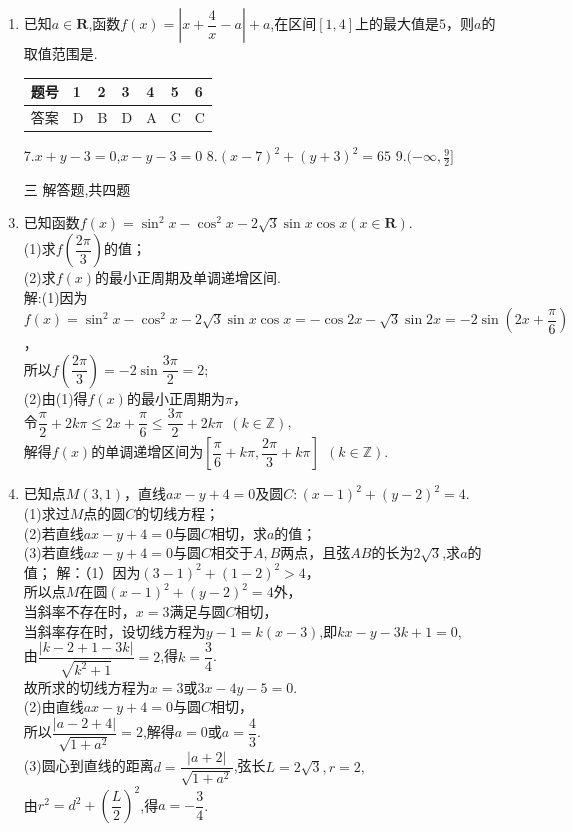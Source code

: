 \documentclass[12pt,twoside]{ctexart}
\begin{document}
\begin{enumerate}
\item 已知$a\in \mathbf{R}$,函数$f(x)=|x+\dfrac{4}{x}-a|+a$,在区间$[1,4]$上的最大值是$5$，则$a$的取值范围是.
\begin{center}
	\begin{tabular}{|p{1.5cm}|p{1.5cm}|p{1.5cm}|p{1.5cm}|p{1.5cm}|p{1.5cm}|p{1.5cm}|}
	\hline
	题号 &1&2 &3 &4 &5 &6  \\
	\hline
	答案 &D &B &D &A &C &C  \\
	\hline
		
	\end{tabular}
\end{center}

7.\underline{$x+y-3=0$},\underline{$x-y-3=0$} \hfill 8.\underline{$(x-7)^2+(y+3)^2=65$} \hfill 9.\underline{$(-\infty,\frac{9}{2}]$}

\item[\kaishu{}三]{\kaishu{}解答题,共四题}%

\item 已知函数$f(x)=\sin ^2 x-\cos ^2 x-2\sqrt{3}\sin x \cos x(x \in \mathbf{R}).$\\
(1)求$f(\dfrac{2\pi}{3})$的值；\\
(2)求$f(x)$的最小正周期及单调递增区间.\\
解:(1)因为$f(x)=\sin ^2 x-\cos ^2 x-2\sqrt{3}\sin x \cos x=-\cos 2x -\sqrt{3}\sin 2x=-2\sin (2x+\dfrac{\pi}{6})$，\\
所以$f(\dfrac{2\pi}{3})=-2\sin \dfrac{3\pi}{2}=2;$\\
(2)由(1)得$f(x)$的最小正周期为$\pi$，\\
令$\dfrac{\pi}{2}+2k\pi \leq 2x+\dfrac{\pi}{6}\leq \dfrac{3\pi}{2}+2k\pi ~~(k \in \mathbb{Z})$,\\
解得$f(x)$的单调递增区间为$[\dfrac{\pi}{6}+k\pi,\dfrac{2\pi}{3}+k\pi]~~(k \in \mathbb{Z})$.



\item 已知点$M(3,1)$，直线$ax-y+4=0$及圆$C:(x-1)^2+(y-2)^2=4$.\\
(1)求过$M$点的圆$C$的切线方程；\\
(2)若直线$ax-y+4=0$与圆$C$相切，求$a$的值；\\
(3)若直线$ax-y+4=0$与圆$C$相交于$A,B$两点，且弦$AB$的长为$2\sqrt{3}$,求$a$的值；
解：（1）因为$(3-1)^2+(1-2)^2>4$，\\
所以点$M$在圆$(x-1)^2+(y-2)^2=4$外，\\
当斜率不存在时，$x=3$满足与圆$C$相切，\\
当斜率存在时，设切线方程为$y-1=k(x-3)$,即$kx-y-3k+1=0$,\\
由$\dfrac{|k-2+1-3k|}{\sqrt{k^2+1}}=2$,得$k=\dfrac{3}{4}$.\\
故所求的切线方程为$x=3$或$3x-4y-5=0$.\\
(2)由直线$ax-y+4=0$与圆$C$相切，\\
所以$\dfrac{|a-2+4|}{\sqrt{1+a^2}}=2$,解得$a=0$或$a=\dfrac{4}{3}$.\\
(3)圆心到直线的距离$d=\dfrac{|a+2|}{\sqrt{1+a^2}}$,弦长$L=2\sqrt{3},r=2,$\\
由$r^2=d^2+(\dfrac{L}{2})^2$,得$a=-\dfrac{3}{4}$.



\end{enumerate}
\end{document}
